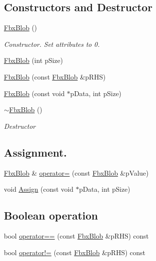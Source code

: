 \subsection*{Constructors and Destructor}
\begin{DoxyCompactItemize}
\item 
\hyperlink{class_fbx_blob_ad1013b102b7e2b54e5cb3ffe326e0738}{Fbx\+Blob} ()
\begin{DoxyCompactList}\small\item\em Constructor. Set attributes to 0. \end{DoxyCompactList}\item 
\hyperlink{class_fbx_blob_aaab0ee64d11daa7aff57542daad4105e}{Fbx\+Blob} (int p\+Size)
\item 
\hyperlink{class_fbx_blob_a2636c1976b481f86ee4393c0d50b0470}{Fbx\+Blob} (const \hyperlink{class_fbx_blob}{Fbx\+Blob} \&p\+R\+HS)
\item 
\hyperlink{class_fbx_blob_a2359aefdd7854a89d3d4bff0980696c1}{Fbx\+Blob} (const void $\ast$p\+Data, int p\+Size)
\item 
\hyperlink{class_fbx_blob_ab0e197c8fc8bd7ff64d1d95501984132}{$\sim$\+Fbx\+Blob} ()
\begin{DoxyCompactList}\small\item\em Destructor \end{DoxyCompactList}\end{DoxyCompactItemize}
\subsection*{Assignment.}
\begin{DoxyCompactItemize}
\item 
\hyperlink{class_fbx_blob}{Fbx\+Blob} \& \hyperlink{class_fbx_blob_aaa69c14d3d6ad7c6720957cd6c08712a}{operator=} (const \hyperlink{class_fbx_blob}{Fbx\+Blob} \&p\+Value)
\item 
void \hyperlink{class_fbx_blob_a9370942703afba1f51798ff5ac2b0ec5}{Assign} (const void $\ast$p\+Data, int p\+Size)
\end{DoxyCompactItemize}
\subsection*{Boolean operation}
\begin{DoxyCompactItemize}
\item 
bool \hyperlink{class_fbx_blob_ad8de66a73abbec7cb602653ca2008a6d}{operator==} (const \hyperlink{class_fbx_blob}{Fbx\+Blob} \&p\+R\+HS) const
\item 
bool \hyperlink{class_fbx_blob_a8a37da8658286521abc8c085f1fdbb69}{operator!=} (const \hyperlink{class_fbx_blob}{Fbx\+Blob} \&p\+R\+HS) const
\end{DoxyCompactItemize}
